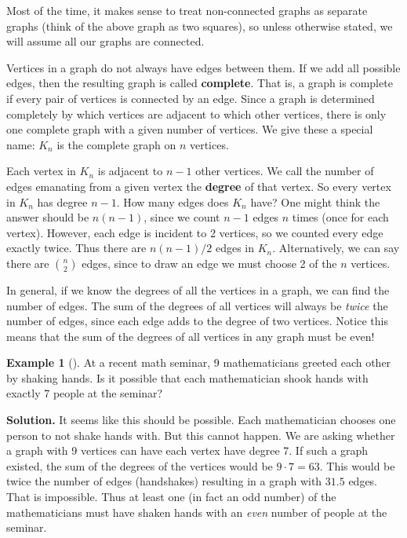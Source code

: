 \documentclass[10pt,]{book}
\newcommand{\terminology}[1]{\textbf{#1}}
\theoremstyle{plain}
\theoremstyle{definition}
\theoremstyle{definition}
\newtheorem{example}[theorem]{Example}
\theoremstyle{definition}
\theoremstyle{definition}
\numberwithin{equation}{chapter}
\begin{document}
\par
\hypertarget{p-1521}{}%
Most of the time, it makes sense to treat non-connected graphs as separate graphs (think of the above graph as two squares), so unless otherwise stated, we will assume all our graphs are connected.%
\par
\hypertarget{p-1522}{}%
Vertices in a graph do not always have edges between them. If we add all possible edges, then the resulting graph is called \terminology{complete}. That is, a graph is complete if every pair of vertices is connected by an edge. Since a graph is determined completely by which vertices are adjacent to which other vertices, there is only one complete graph with a given number of vertices. We give these a special name: \(K_n\)\label{notation-33}
 is the complete graph on \(n\) vertices.%
\par
\hypertarget{p-1523}{}%
Each vertex in \(K_n\) is adjacent to \(n-1\) other vertices. We call the number of edges emanating from a given vertex the \terminology{degree} of that vertex. So every vertex in \(K_n\) has degree \(n-1\). How many edges does \(K_n\) have? One might think the answer should be \(n(n-1)\), since we count \(n-1\) edges \(n\) times (once for each vertex). However, each edge is incident to 2 vertices, so we counted every edge exactly twice. Thus there are \(n(n-1)/2\) edges in \(K_n\). Alternatively, we can say there are \({n \choose 2}\) edges, since to draw an edge we must choose 2 of the \(n\) vertices.%
\par
\hypertarget{p-1524}{}%
In general, if we know the degrees of all the vertices in a graph, we can find the number of edges. The sum of the degrees of all vertices will always be \emph{twice} the number of edges, since each edge adds to the degree of two vertices. Notice this means that the sum of the degrees of all vertices in any graph must be even!%
\begin{example}[]\label{example-79}
\hypertarget{p-1525}{}%
At a recent math seminar, 9 mathematicians greeted each other by shaking hands. Is it possible that each mathematician shook hands with exactly 7 people at the seminar?%
\par\smallskip%
\noindent\textbf{Solution.}\hypertarget{solution-155}{}\quad%
\hypertarget{p-1526}{}%
It seems like this should be possible. Each mathematician chooses one person to not shake hands with. But this cannot happen. We are asking whether a graph with 9 vertices can have each vertex have degree 7. If such a graph existed, the sum of the degrees of the vertices would be \(9\cdot 7 = 63\). This would be twice the number of edges (handshakes) resulting in a graph with \(31.5\) edges. That is impossible. Thus at least one (in fact an odd number) of the mathematicians must have shaken hands with an \emph{even} number of people at the seminar.%
\end{example}
\end{document}
